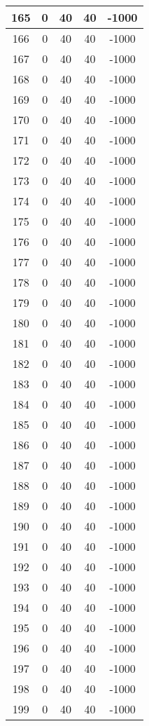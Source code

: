 \documentclass[letterpaper, 12pt]{article}
\begin{document}
\begin{longtable}{|c|c|c|c|c|}
\hline
165 & 0 & 40 & 40 & -1000 \\
\hline
166 & 0 & 40 & 40 & -1000 \\
\hline
167 & 0 & 40 & 40 & -1000 \\
\hline
168 & 0 & 40 & 40 & -1000 \\
\hline
169 & 0 & 40 & 40 & -1000 \\
\hline
170 & 0 & 40 & 40 & -1000 \\
\hline
171 & 0 & 40 & 40 & -1000 \\
\hline
172 & 0 & 40 & 40 & -1000 \\
\hline
173 & 0 & 40 & 40 & -1000 \\
\hline
174 & 0 & 40 & 40 & -1000 \\
\hline
175 & 0 & 40 & 40 & -1000 \\
\hline
176 & 0 & 40 & 40 & -1000 \\
\hline
177 & 0 & 40 & 40 & -1000 \\
\hline
178 & 0 & 40 & 40 & -1000 \\
\hline
179 & 0 & 40 & 40 & -1000 \\
\hline
180 & 0 & 40 & 40 & -1000 \\
\hline
181 & 0 & 40 & 40 & -1000 \\
\hline
182 & 0 & 40 & 40 & -1000 \\
\hline
183 & 0 & 40 & 40 & -1000 \\
\hline
184 & 0 & 40 & 40 & -1000 \\
\hline
185 & 0 & 40 & 40 & -1000 \\
\hline
186 & 0 & 40 & 40 & -1000 \\
\hline
187 & 0 & 40 & 40 & -1000 \\
\hline
188 & 0 & 40 & 40 & -1000 \\
\hline
189 & 0 & 40 & 40 & -1000 \\
\hline
190 & 0 & 40 & 40 & -1000 \\
\hline
191 & 0 & 40 & 40 & -1000 \\
\hline
192 & 0 & 40 & 40 & -1000 \\
\hline
193 & 0 & 40 & 40 & -1000 \\
\hline
194 & 0 & 40 & 40 & -1000 \\
\hline
195 & 0 & 40 & 40 & -1000 \\
\hline
196 & 0 & 40 & 40 & -1000 \\
\hline
197 & 0 & 40 & 40 & -1000 \\
\hline
198 & 0 & 40 & 40 & -1000 \\
\hline
199 & 0 & 40 & 40 & -1000 \\
\hline
\end{longtable}
\end{document}
